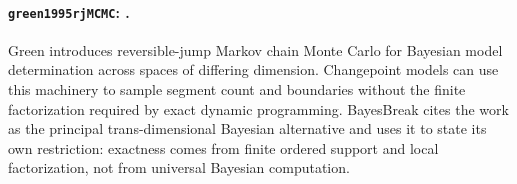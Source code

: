 
\paragraph{\texttt{green1995rjMCMC}: \citet{green1995rjMCMC}.}
Green introduces reversible-jump Markov chain Monte Carlo for Bayesian model determination across spaces of differing dimension. Changepoint models can use this machinery to sample segment count and boundaries without the finite factorization required by exact dynamic programming. BayesBreak cites the work as the principal trans-dimensional Bayesian alternative and uses it to state its own restriction: exactness comes from finite ordered support and local factorization, not from universal Bayesian computation.
